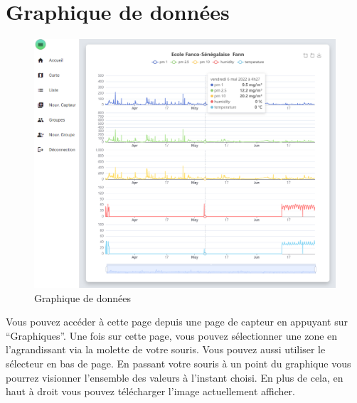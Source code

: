 \section{Graphique de données}\label{sec:graphique-de-donnees}

    \begin{figure}[H]
        \begin{center}
            \includegraphics[width=12cm]{resources/graph}
        \end{center}
        \caption{Graphique de données}\label{fig:graphique-de-donnes)}
    \end{figure}

    Vous pouvez accéder à cette page depuis une page de capteur en appuyant sur ``Graphiques''.
    Une fois sur cette page, vous pouvez sélectionner une zone en l'agrandissant via la molette de votre souris.
    Vous pouvez aussi utiliser le sélecteur en bas de page.
    En passant votre souris à un point du graphique vous pourrez visionner l'ensemble des valeurs à l'instant choisi.
    En plus de cela, en haut à droit vous pouvez télécharger l'image actuellement afficher.